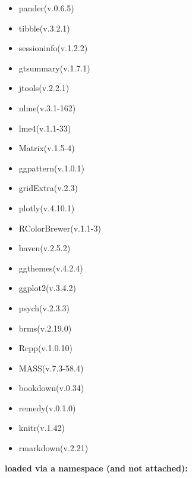 \documentclass[
]{article}
\begin{document}
\begin{itemize}
\item
  pander(v.0.6.5)
\item
  tibble(v.3.2.1)
\item
  sessioninfo(v.1.2.2)
\item
  gtsummary(v.1.7.1)
\item
  jtools(v.2.2.1)
\item
  nlme(v.3.1-162)
\item
  lme4(v.1.1-33)
\item
  Matrix(v.1.5-4)
\item
  ggpattern(v.1.0.1)
\item
  gridExtra(v.2.3)
\item
  plotly(v.4.10.1)
\item
  RColorBrewer(v.1.1-3)
\item
  haven(v.2.5.2)
\item
  ggthemes(v.4.2.4)
\item
  ggplot2(v.3.4.2)
\item
  psych(v.2.3.3)
\item
  brms(v.2.19.0)
\item
  Rcpp(v.1.0.10)
\item
  MASS(v.7.3-58.4)
\item
  bookdown(v.0.34)
\item
  remedy(v.0.1.0)
\item
  knitr(v.1.42)
\item
  rmarkdown(v.2.21)
\end{itemize}

\textbf{loaded via a namespace (and not attached):}
\end{document}
